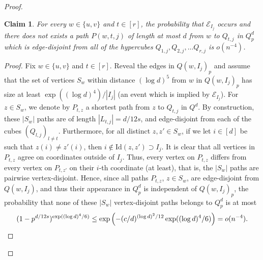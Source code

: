 \documentclass[reqno,final,a4paper]{amsart}
\newtheorem{claim}[thm]{Claim}
\theoremstyle{definition}
\def\Id{\mathrm{Id}}
\newcommand{\1}{\mathbbm{1}}
\begin{document}
\begin{proof}
\begin{claim}\label{claim:join_vertices_tocubes}
For every $w\in \{u,v\}$ and $t\in [r]$, the probability that $\mathcal{E}_{I_j}$ occurs and there does not exists a path $P(w,t,j)$ of length at most $d$ from $w$ to $Q_{t,j}$ in $Q^d_p$ which is edge-disjoint from all of the hypercubes $Q_{1,j},Q_{2,j},\ldots Q_{r,j}$ is $o(n^{-4})$.
\end{claim}
\begin{proof}
Fix $w\in \{u,v\}$ and $t\in [r]$.
Reveal the edges in $Q(w,I_j)_p$ and assume that the set of vertices $S_w$ within distance $(\log d)^5$ from $w$ in $Q(w,I_j)_p$ has size at least $\exp((\log d)^4)/|I_j|$ (an event which is implied by $\mathcal{E}_{I_j}$). 
For $z\in S_w$, we denote by $P_{t,z}$ a shortest path from $z$ to $Q_{t,j}$ in $Q^d$. 
By construction, these $|S_w|$ paths are of length $|L_{t,j}|=d/12s$, and edge-disjoint from each of the cubes $(Q_{l,j})_{l\neq t}$. Furthermore, for all distinct $z,z'\in S_w$, if we let $i\in [d]$ be such that $z(i)\neq z'(i)$, then $i\notin \Id(z,z')\supset I_j$. It is clear that all vertices in $P_{t,z}$ agree on coordinates outside of $I_j$. Thus, every vertex on $P_{t,z}$ differs from every vertex 
on $P_{t,z'}$ on their $i$-th coordinate (at least), that is, the $|S_w|$ paths are pairwise vertex-disjoint. Hence, since all paths $P_{t,z}$, $z\in S_w$, are edge-disjoint from $Q(w,I_j)$, and thus their appearance in $Q_p^d$ is independent of $Q(w,I_j)_p$, the probability that none of these $|S_w|$ vertex-disjoint paths belongs to $Q_p^d$ is at most
\begin{equation*}
    (1-p^{d/12s})^{\exp((\log d)^4/6)}\leq \exp\left(-(c/d)^{(\log d)^2/12}\exp((\log d)^4/6)\right) = o(n^{-4}).\qedhere
\end{equation*}
\end{proof}


\end{proof}
\end{document}
